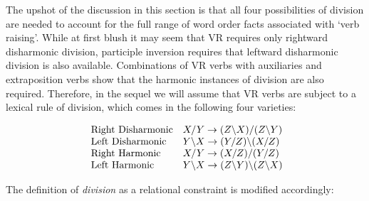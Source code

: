 The upshot of the discussion in this section is that all four possibilities of
division are needed to account for the full range of word order facts associated
with `verb raising'.  While at first blush it may seem that VR requires only
rightward disharmonic division, participle inversion requires that leftward
disharmonic division is also available.  Combinations of VR verbs with 
auxiliaries
and extraposition verbs show that the harmonic instances of division are also
required.  Therefore, in the sequel we will assume that VR verbs are subject to 
a
lexical rule of division, which comes in the following four varieties:

\begin{equation}
\begin{array}[t]{ll}
\mbox{ Right Disharmonic} &X/Y \rightarrow (Z\backslash X)/(Z\backslash Y) \\
\mbox{ Left Disharmonic} & Y\backslash X \rightarrow (Y/Z)\backslash(X/Z) \\
\mbox{ Right Harmonic} & X/Y \rightarrow (X/Z)/(Y/Z) \\
\mbox{ Left Harmonic} & 
Y\backslash X \rightarrow (Z\backslash Y)\backslash (Z\backslash X) 
\end{array}
\end{equation}

The definition of {\em division} as a relational constraint is modified 
accordingly:

\pr
\pred
{}
\epred
\epr

